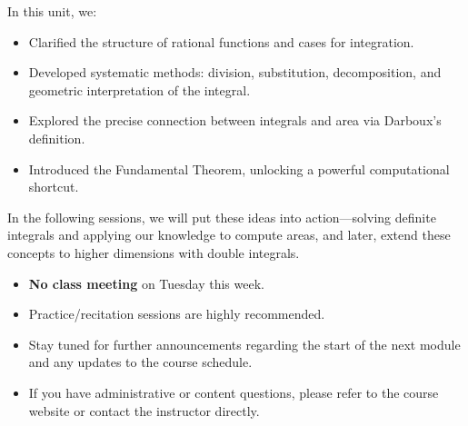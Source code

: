 \documentclass[11pt]{article}
\theoremstyle{definition}
\theoremstyle{plain}
\newenvironment{announcement}{%
    \par\vspace{10pt}%
    \begin{tcolorbox}[breakable, enhanced, colframe=black, colback=gray!14, title=Course Administration, leftrule=4pt, rightrule=0pt, top=3pt, bottom=3pt, fonttitle=\normalsize\bfseries]%
}{%
    \end{tcolorbox}\vspace{4pt}%
}
\begin{document}
In this unit, we:
\begin{itemize}
    \item Clarified the structure of rational functions and cases for integration.
    \item Developed systematic methods: division, substitution, decomposition, and geometric interpretation of the integral.
    \item Explored the precise connection between integrals and area via Darboux's definition.
    \item Introduced the Fundamental Theorem, unlocking a powerful computational shortcut.
\end{itemize}
In the following sessions, we will put these ideas into action—solving definite integrals and applying our knowledge to compute areas, and later, extend these concepts to higher dimensions with double integrals.

\begin{announcement}
    \begin{itemize}[leftmargin=1.5em]
        \item \textbf{No class meeting} on Tuesday this week.
        \item Practice/recitation sessions are highly recommended.
        \item Stay tuned for further announcements regarding the start of the next module and any updates to the course schedule.
        \item If you have administrative or content questions, please refer to the course website or contact the instructor directly.
    \end{itemize}
\end{announcement}
\end{document}
